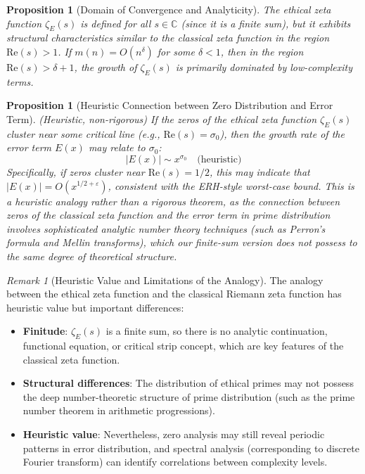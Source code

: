 \documentclass[12pt,a4paper]{article}
\newtheorem{proposition}[theorem]{Proposition}
\theoremstyle{definition}
\theoremstyle{remark}
\newtheorem{remark}[theorem]{Remark}
\begin{document}
\begin{proposition}[Domain of Convergence and Analyticity]
\label{prop:zeta_convergence}
The ethical zeta function $\zeta_E(s)$ is defined for all $s \in \mathbb{C}$ (since it is a finite sum), but it exhibits structural characteristics similar to the classical zeta function in the region $\text{Re}(s) > 1$. If $m(n) = O(n^\delta)$ for some $\delta < 1$, then in the region $\text{Re}(s) > \delta + 1$, the growth of $\zeta_E(s)$ is primarily dominated by low-complexity terms.
\end{proposition}

\begin{proposition}[Heuristic Connection between Zero Distribution and Error Term]
\label{prop:zeros_error_heuristic}
(Heuristic, non-rigorous) If the zeros of the ethical zeta function $\zeta_E(s)$ cluster near some critical line (e.g., $\text{Re}(s) = \sigma_0$), then the growth rate of the error term $E(x)$ may relate to $\sigma_0$:
\[
|E(x)| \sim x^{\sigma_0} \quad \text{(heuristic)}
\]
Specifically, if zeros cluster near $\text{Re}(s) = 1/2$, this may indicate that $|E(x)| = O(x^{1/2 + \varepsilon})$, consistent with the ERH-style worst-case bound. This is a heuristic analogy rather than a rigorous theorem, as the connection between zeros of the classical zeta function and the error term in prime distribution involves sophisticated analytic number theory techniques (such as Perron's formula and Mellin transforms), which our finite-sum version does not possess to the same degree of theoretical structure.
\end{proposition}

\begin{remark}[Heuristic Value and Limitations of the Analogy]
The analogy between the ethical zeta function and the classical Riemann zeta function has heuristic value but important differences:
\begin{itemize}
    \item \textbf{Finitude}: $\zeta_E(s)$ is a finite sum, so there is no analytic continuation, functional equation, or critical strip concept, which are key features of the classical zeta function.
    \item \textbf{Structural differences}: The distribution of ethical primes may not possess the deep number-theoretic structure of prime distribution (such as the prime number theorem in arithmetic progressions).
    \item \textbf{Heuristic value}: Nevertheless, zero analysis may still reveal periodic patterns in error distribution, and spectral analysis (corresponding to discrete Fourier transform) can identify correlations between complexity levels.
\end{itemize}
\end{remark}
\end{document}
